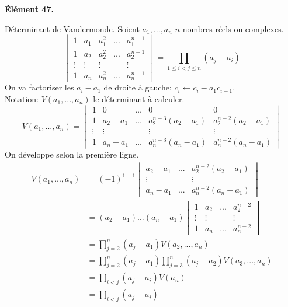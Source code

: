 \documentclass[11pt]{article}
\begin{document}
\begin{center}
    \bf{Élément 47.}
\end{center}

\begin{thm}{Déterminant de Vandermonde.}{}
    Soient $a_1,...,a_n$ $n$ nombres réels ou complexes.
    \begin{equation*}
        \begin{vmatrix}
            1&a_1&a_1^2&...&a_1^{n-1}\\
            1&a_2&a_2^2&...&a_2^{n-1}\\
            \vdots&\vdots&\vdots&&\vdots\\
            1&a_n&a_n^2&...&a_n^{n-1}
        \end{vmatrix}
        = \prod_{1\leq i < j \leq n}(a_j-a_i)
    \end{equation*}
    \tcblower
    On va factoriser les $a_i-a_1$ de droite à gauche: $c_i \gets c_i - a_1 c_{i-1}$.\\
    Notation: $V(a_1,...,a_n)$ le déterminant à calculer.
    \begin{equation*}
        V(a_1,...,a_n)=\begin{vmatrix}
            1&0&\dots&0&0\\
            1&a_2-a_1&\dots&a_2^{n-3}(a_2-a_1)&a_2^{n-2}(a_2-a_1)\\
            \vdots&\vdots&&\vdots&\vdots\\
            1&a_n-a_1&\dots&a_n^{n-3}(a_n-a_1)&a_n^{n-2}(a_n-a_1)
        \end{vmatrix}
    \end{equation*}
    On développe selon la première ligne.
    \begin{align*}
        V(a_1,...,a_n)&=(-1)^{1+1}\begin{vmatrix}
            a_2-a_1&...&a_2^{n-2}(a_2-a_1)\\
            \vdots&&\vdots\\
            a_n-a_1&...&a_n^{n-2}(a_n-a_1)
        \end{vmatrix}\\
        &=(a_2-a_1)...(a_n-a_1)\begin{vmatrix}
            1&a_2&...&a_2^{n-2}\\
            \vdots&\vdots&&\vdots\\
            1&a_n&...&a_n^{n-2}
        \end{vmatrix}\\
        &=\prod_{j=2}^n(a_j-a_1)V(a_2,...,a_n)\\
        &=\prod_{j=2}^n(a_j-a_1)\prod_{j=3}^n(a_j-a_2)V(a_3,...,a_n)\\
        &=\prod_{i<j}(a_j-a_i)V(a_n)\\
        &=\prod_{i<j}(a_j-a_i)
    \end{align*}
\end{thm}
\end{document}
